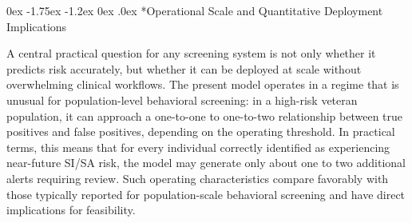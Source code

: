 \documentclass[onecolumn, compsoc,11pt]{IEEEtran}
\makeatletter
\renewcommand\subsection{\@startsection {subsection}{2}{\z@}
  {0ex \@plus -1.75ex \@minus -1.2ex}
  {0ex \@plus.0ex}
  {\fontsize{11}{11}\selectfont\bfseries\sffamily}}
\makeatother
\begin{document}
\subsection*{Operational Scale and Quantitative Deployment Implications}

A central practical question for any screening system is not only whether it predicts risk accurately, but whether it can be deployed at scale without overwhelming clinical workflows. The present model operates in a regime that is unusual for population-level behavioral screening: in a high-risk veteran population, it can approach a one-to-one to one-to-two relationship between true positives and false positives, depending on the operating threshold. In practical terms, this means that for every individual correctly identified as experiencing near-future SI/SA risk, the model may generate only about one to two additional alerts requiring review. Such operating characteristics compare favorably with those typically reported for population-scale behavioral screening and have direct implications for feasibility.
\end{document}
